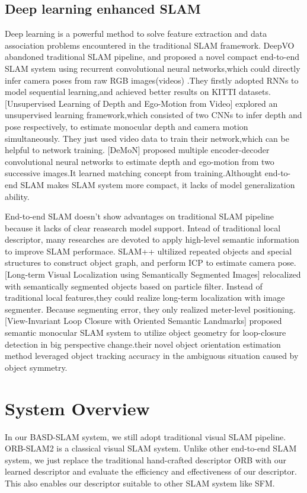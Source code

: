 \documentclass{svproc}
\begin{document}
\subsection{Deep learning enhanced SLAM}
Deep learning is a powerful method to solve feature extraction and data association problems encountered in the traditional SLAM framework. 
DeepVO abandoned traditional SLAM pipeline, and proposed a novel compact end-to-end SLAM system using recurrent convolutional neural networks,which could directly infer camera poses from raw RGB images(videos) .They firstly adopted RNNs to model sequential learning,and achieved better results on KITTI datasets. 
[Unsupervised Learning of Depth and Ego-Motion from Video] explored an unsupervised learning framework,which consisted of two CNNs to infer depth and pose respectively, to estimate monocular depth and camera motion simultaneously. They just used video data to train their network,which can be helpful to network training.
[DeMoN] proposed multiple encoder-decoder convolutional neural networks to estimate depth and ego-motion from two successive images.It learned matching concept from training.Althought end-to-end SLAM makes SLAM system more compact, it lacks of model generalization ability.

End-to-end SLAM doesn't show advantages on traditional SLAM pipeline because it lacks of clear reasearch model support. Intead of traditional local descriptor, many researches are devoted to apply high-level semantic information to improve SLAM performace. 
SLAM++ ultilized repeated objects and special structures to construct object graph, and perform ICP to estimate camera pose.  
[Long-term Visual Localization using Semantically Segmented Images] relocalized with semantically segmented objects based on particle filter. Instead of traditional local features,they could realize long-term localization with image segmenter. Because segmenting error, they only realized meter-level positioning.  
[View-Invariant Loop Closure with Oriented Semantic Landmarks] proposed semantic monocular SLAM system  to utilize object geometry for loop-closure detection in big perspective change.their novel object orientation estimation method  leveraged object tracking accuracy in the ambiguous situation caused by object symmetry.



\section{System Overview}
In our BASD-SLAM system, we still adopt traditional visual SLAM pipeline. ORB-SLAM2 is a classical visual SLAM system. Unlike other end-to-end SLAM system, we just replace the traditional hand-crafted descriptor ORB with our learned descriptor and evaluate the efficiency and effectiveness of our descriptor. This also enables our descriptor suitable to other SLAM system like SFM.
\end{document}
